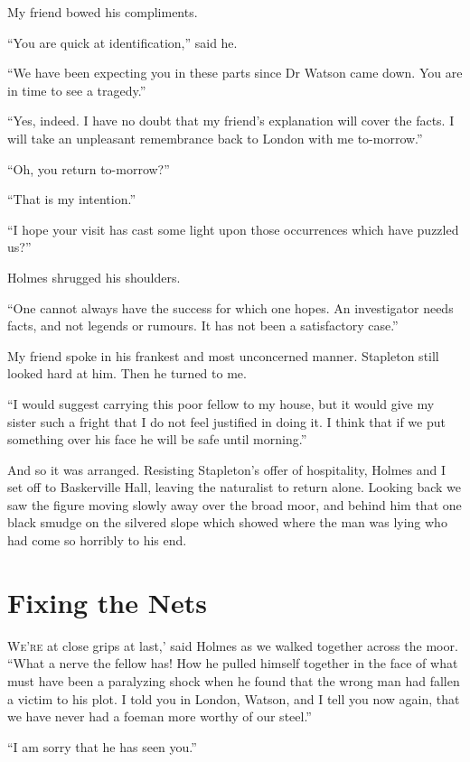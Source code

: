 \documentclass[paper=5.5in:8.5in,BCOR=7mm,twoside,DIV=calc,12pt,usegeometry,openany,chapterprefix,endperiod]{scrbook} %
\begin{document}
My friend bowed his compliments.

\enquote{You are quick at identification,} said he.

\enquote{We have been expecting you in these parts since Dr Watson came down. You are in time to see a tragedy.}

\enquote{Yes, indeed. I have no doubt that my friend's explanation will cover the facts. I will take an unpleasant remembrance back to London with me to-morrow.}

\enquote{Oh, you return to-morrow?}

\enquote{That is my intention.}

\enquote{I hope your visit has cast some light upon those occurrences which have puzzled us?}

Holmes shrugged his shoulders.

\enquote{One cannot always have the success for which one hopes. An investigator needs facts, and not legends or rumours. It has not been a satisfactory case.}

My friend spoke in his frankest and most unconcerned manner. Stapleton still looked hard at him. Then he turned to me.

\enquote{I would suggest carrying this poor fellow to my house, but it would give my sister such a fright that I do not feel justified in doing it. I think that if we put something over his face he will be safe until morning.}

And so it was arranged. Resisting Stapleton's offer of hospitality, Holmes and I set off to Baskerville Hall, leaving the naturalist to return alone. Looking back we saw the figure moving slowly away over the broad moor, and behind him that one black smudge on the silvered slope which showed where the man was lying who had come so horribly to his end.

\chapter{Fixing the Nets}

\lettrine[ante=`,lines=1]{W}{e're} at close grips at last,' said Holmes as we walked together across the moor. \enquote{What a nerve the fellow has! How he pulled himself together in the face of what must have been a paralyzing shock when he found that the wrong man had fallen a victim to his plot. I told you in London, Watson, and I tell you now again, that we have never had a foeman more worthy of our steel.}

\enquote{I am sorry that he has seen you.}
\end{document}
